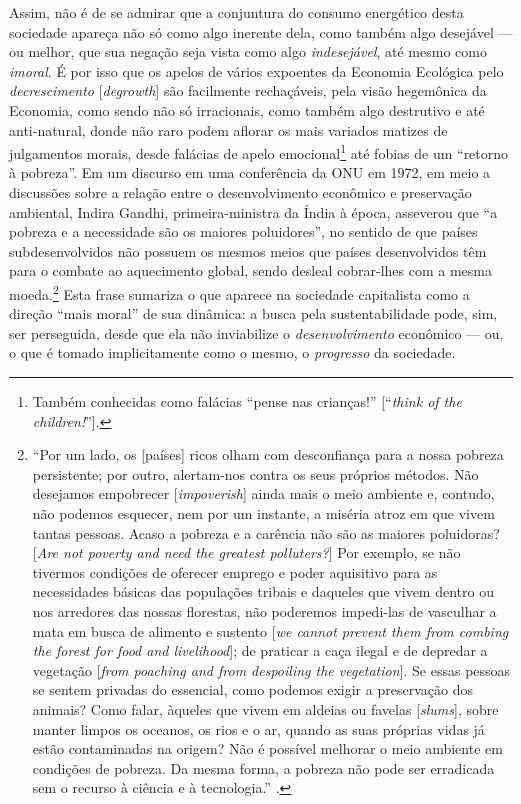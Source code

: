 Assim, não é de se admirar que a conjuntura do consumo energético desta sociedade apareça não só como algo inerente dela, como também algo desejável --- ou melhor, que sua negação seja vista como algo \textit{indesejável}, até mesmo como \textit{imoral}. É por isso que os apelos de vários expoentes da Economia Ecológica pelo \textit{decrescimento} [\textit{degrowth}] são facilmente rechaçáveis, pela visão hegemônica da Economia, como sendo não só irracionais, como também algo destrutivo e até anti-natural, donde não raro podem aflorar os mais variados matizes de julgamentos morais, desde falácias de apelo emocional\footnote{Também conhecidas como falácias ``pense nas crianças!'' [``\textit{think of the children!}''].} até fobias de um ``retorno à pobreza''. Em um discurso em uma conferência da ONU em 1972, em meio a discussões sobre a relação entre o desenvolvimento econômico e preservação ambiental, Indira Gandhi, primeira-ministra da Índia à época, asseverou que ``a pobreza e a necessidade são os maiores poluidores'', no sentido de que países subdesenvolvidos não possuem os mesmos meios que países desenvolvidos têm para o combate ao aquecimento global, sendo desleal cobrar-lhes com a mesma moeda.\footnote{``Por um lado, os [países] ricos olham com desconfiança para a nossa pobreza persistente; por outro, alertam-nos contra os seus próprios métodos. Não desejamos empobrecer [\textit{impoverish}] ainda mais o meio ambiente e, contudo, não podemos esquecer, nem por um instante, a miséria atroz em que vivem tantas pessoas. Acaso a pobreza e a carência não são as maiores poluidoras? [\textit{Are not poverty and need the greatest polluters?}] Por exemplo, se não tivermos condições de oferecer emprego e poder aquisitivo para as necessidades básicas das populações tribais e daqueles que vivem dentro ou nos arredores das nossas florestas, não poderemos impedi-las de vasculhar a mata em busca de alimento e sustento [\textit{we cannot prevent them from combing the forest for food and livelihood}]; de praticar a caça ilegal e de depredar a vegetação [\textit{from poaching and from despoiling the vegetation}]. Se essas pessoas se sentem privadas do essencial, como podemos exigir a preservação dos animais? Como falar, àqueles que vivem em aldeias ou favelas [\textit{slums}], sobre manter limpos os oceanos, os rios e o ar, quando as suas próprias vidas já estão contaminadas na origem? Não é possível melhorar o meio ambiente em condições de pobreza. Da mesma forma, a pobreza não pode ser erradicada sem o recurso à ciência e à tecnologia.'' \parencite{Gandhi1972}.}  Esta frase sumariza o que aparece na sociedade capitalista como a direção ``mais moral'' de sua dinâmica: a busca pela sustentabilidade pode, sim, ser perseguida, desde que ela não inviabilize o \textit{desenvolvimento} econômico --- ou, o que é tomado implicitamente como o mesmo, o \textit{progresso} da sociedade. 

